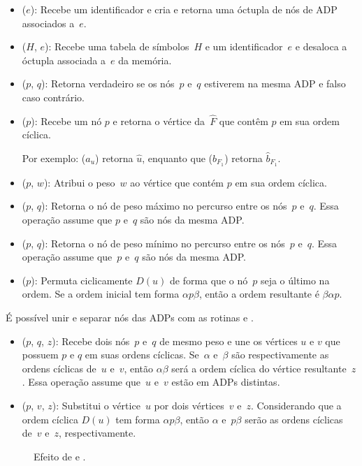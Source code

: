 \begin{itemize}
\item \LCOMakeOcto($e$): Recebe um identificador e cria e retorna uma óctupla de nós de ADP associados a~$e$.
\item \LCODestroyOcto($H$, $e$): Recebe uma tabela de símbolos~$H$ e um identificador~$e$ e desaloca a óctupla associada a~$e$ da memória.

\item \LCOConnected($p$, $q$): Retorna verdadeiro se os nós~$p$ e~$q$ estiverem na mesma ADP e falso caso contrário.
\item \LCOFindNode($p$): Recebe um nó $p$ e retorna o vértice da~$\hat F$ que contêm $p$ em sua ordem cíclica.

Por exemplo: \LCOFindNode($a_u$) retorna $\hat u$, enquanto que \LCOFindNode($b_{F_1}$) retorna $\hat b_{F_1}$.
\item \LCOAddCost($p$, $w$): Atribui o peso~$w$ ao vértice que contém $p$ em sua ordem cíclica.
\item \LCOMax($p$, $q$): Retorna o nó de peso máximo no percurso entre os nós~$p$ e~$q$.
Essa operação assume que $p$ e~$q$ são nós da mesma ADP.
\item \LCOMin($p$, $q$): Retorna o nó de peso mínimo no percurso entre os nós~$p$ e~$q$.
Essa operação assume que~$p$ e~$q$ são nós da mesma ADP.
\item \LCOCycle($p$): Permuta ciclicamente $D(u)$ de forma que o nó~$p$ seja o último na ordem.
Se a ordem inicial tem forma $\alpha p \beta$, então a ordem resultante é $\beta\alpha p$.
\end{itemize}

É possível unir e separar nós das ADPs com as rotinas \LCOMerge{} e \LCOSplit{}.

\begin{itemize}
\item \LCOMerge($p$, $q$, $z$): Recebe dois nós~$p$ e~$q$ de mesmo peso e une os vértices $u$ e $v$ que possuem $p$ e $q$ em suas ordens cíclicas.
Se~$\alpha$ e~$\beta$ são respectivamente as ordens cíclicas de~$u$ e~$v$, então $\alpha\beta$ será a ordem cíclica do vértice resultante~$z$. 
Essa operação assume que~$u$ e~$v$ estão em ADPs distintas.

\item \LCOSplit($p$, $v$, $z$): Substitui o vértice~$u$ por dois vértices~$v$ e~$z$.
Considerando que a ordem cíclica $D(u)$ tem forma $\alpha p\beta$, então $\alpha$ e~$p\beta$ serão as ordens cíclicas de~$v$ e~$z$, respectivamente.

\end{itemize}
\begin{figure}[htb]
\scalebox{1}{
\centering

}
\caption{Efeito de \LCOMerge{} e \LCOSplit{}.}
\label{fig:MSF-Merge-Split}
\end{figure}



